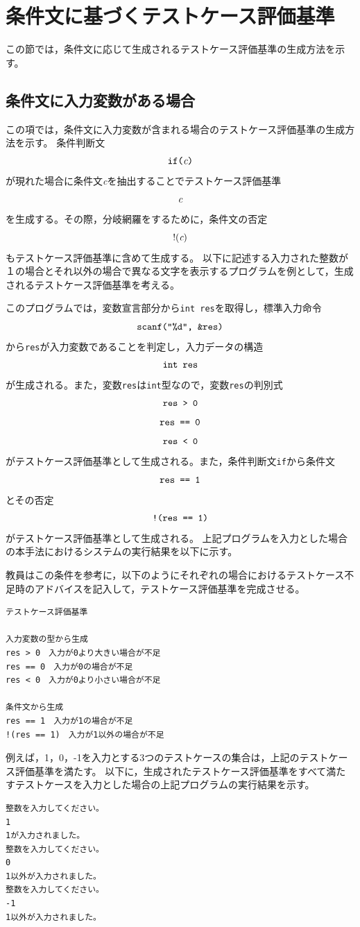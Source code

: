 \documentclass{tpu-sotu}
\begin{document}
\section{条件文に基づくテストケース評価基準}
この節では，条件文に応じて生成されるテストケース評価基準の生成方法を示す。
\subsection{条件文に入力変数がある場合}
この項では，条件文に入力変数が含まれる場合のテストケース評価基準の生成方法を示す。
条件判断文\\
\[ 
\mbox{{\tt {if({\it c})}}}
\]
が現れた場合に条件文{\it c}を抽出することでテストケース評価基準
\[ 
\mbox{{\it c}}
\]
を生成する。その際，分岐網羅をするために，条件文の否定
\[ 
\mbox{!({\it c})}
\]
もテストケース評価基準に含めて生成する。
以下に記述する入力された整数が１の場合とそれ以外の場合で異なる文字を表示するプログラムを例として，生成されるテストケース評価基準を考える。

このプログラムでは，変数宣言部分から{\tt int res}を取得し，標準入力命令\\
\[ 
\mbox{{\tt {scanf("\%d", \&res)}}}
\]
から{\tt res}が入力変数であることを判定し，入力データの構造\\
\[
\mbox{{\tt  int res}}
\]
が生成される。また，変数{\tt res}は{\tt int}型なので，変数{\tt res}の判別式\\
\[ 
\mbox{\tt{res > 0}} 
\]
\[
\mbox{\tt{res == 0}}
\]
\[
\mbox{\tt{res < 0}}
\]
がテストケース評価基準として生成される。また，条件判断文{\tt if}から条件文\\
\[
\mbox{\tt{res == 1}}
\]
とその否定\\
\[
\mbox{\tt{!(res == 1)}}
\]
がテストケース評価基準として生成される。
上記プログラムを入力とした場合の本手法におけるシステムの実行結果を以下に示す。

教員はこの条件を参考に，以下のようにそれぞれの場合におけるテストケース不足時のアドバイスを記入して，テストケース評価基準を完成させる。
\begin{lstlisting}[xleftmargin=1cm]
テストケース評価基準

入力変数の型から生成
res > 0　入力が0より大きい場合が不足
res == 0　入力が0の場合が不足
res < 0　入力が0より小さい場合が不足

条件文から生成
res == 1　入力が1の場合が不足
!(res == 1)　入力が1以外の場合が不足
\end{lstlisting}
例えば，1，0，-1を入力とする3つのテストケースの集合は，上記のテストケース評価基準を満たす。
以下に，生成されたテストケース評価基準をすべて満たすテストケースを入力とした場合の上記プログラムの実行結果を示す。
\begin{lstlisting}[xleftmargin=1cm]
整数を入力してください。
1
1が入力されました。
整数を入力してください。
0
1以外が入力されました。
整数を入力してください。
-1
1以外が入力されました。
\end{lstlisting}
\end{document}
